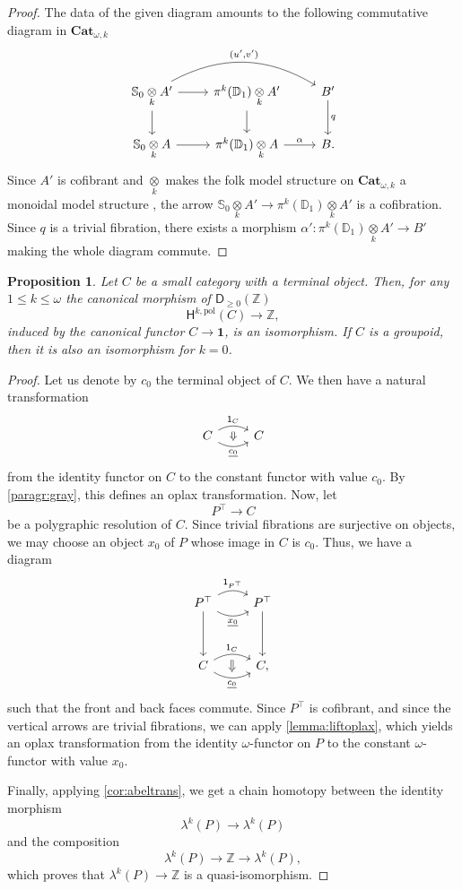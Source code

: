 \documentclass[reqno]{amsart}
\theoremstyle{plain}
\newtheorem{proposition}[subsubsection]{Proposition}
\theoremstyle{definition}
\theoremstyle{remark}
\newcommand{\nmbr}[1]{\mathbb #1}
\newcommand{\Z}{\nmbr{Z}}
\newcommand{\Unit}[1]{\mathsf{1}_{#1}}%
\newcommand{\ctg}[1]{\mathbf{#1}}  %
\newcommand{\Cat}{\ctg{Cat}}   %
\newcommand{\opCat}[1]{\Cat_{\omega,#1}} %
\newcommand{\Term}{\ctg{1}} %
\newcommand{\functor}[1]{\mathsf{#1}} %
\newcommand{\pifun}[2]{\functor{\pi}_{#2}^{#1}}%
\newcommand{\opifun}[1]{\pifun{#1}{}}%
\newcommand{\abel}{\functor{\lambda}} %
\newcommand{\abelk}[1]{\functor{\abel}^{#1}}%
\newcommand{\frgp}[1]{#1^\top} %
\newcommand{\oo}{\ensuremath{\omega}}
\newcommand{\Sph}[1]{\mathbb{S}_{#1}} %
\newcommand{\Dsk}[1]{\mathbb{D}_{#1}} %
\newcommand{\gray}{\otimes}
\newcommand{\grayk}[1]{\underset{#1}{\gray}} %
\newcommand{\cst}[1]{\underline{#1}} %
\newcommand{\Ho}{\functor{H}} %
\newcommand{\Hop}[1]{\Ho^{#1,\mathrm{pol}}} %
\newcommand{\Derp}[1]{\functor{D}_{\geq 0}(#1)}
\newcommand{\nbd}{\nobreakdash} %
\begin{document}
\begin{proof}
  The data of the given diagram amounts to the following commutative
  diagram in $\opCat{k}$
  \[
    \begin{tikzcd}
      \Sph{0} \grayk{k} A' \ar[r]\ar[d] \ar[rr,bend
      left,"{(u',v')}"]& \opifun{k}(\Dsk{1}) \grayk{k} A'
      \ar[d]& B' \ar[d,"q"] \\
      \Sph{0} \grayk{k} A \ar[r] & \opifun{k}(\Dsk{1}) \grayk{k} A \ar[r,"\alpha"]
      & B.
    \end{tikzcd}
  \]
  Since $A'$ is cofibrant and $\grayk{k}$ makes the folk model
  structure on $\opCat{k}$ a monoidal model structure \cite{ara_lucas:folmon}, the
  arrow $ \Sph{0}  \grayk{k} A' \to  \opifun{k}(\Dsk{1}) \grayk{k} A'$ is a
  cofibration. Since $q$ is a trivial fibration, there exists a
  morphism $\alpha' \colon \opifun{k}(\Dsk{1})  \grayk{k} A' \to B'$ making the
  whole diagram commute.
\end{proof}
\begin{proposition}\label{prop:hlgycontrcat}
  Let $C$ be a small category with a terminal object. Then, for any $1
  \leq k \leq \oo$ the
  canonical morphism of $\Derp{\Z}$
  \[
    \Hop{k}(C) \to \Z,
  \]
  induced by the canonical functor $C \to \Term$, is an
  isomorphism. If $C$ is a groupoid, then it is also an isomorphism
  for $k=0$.
\end{proposition}
\begin{proof}
  Let us denote by $c_0$ the terminal object of $C$. We then have a
  natural transformation
    \[
    \begin{tikzcd}
      C \ar[r,bend left,"\Unit{C}",""{name=A,below}]
      \ar[r,bend right,"\cst{c_0}"',""{name=B,above}] & C
      \ar[from=A,to=B,Rightarrow]
    \end{tikzcd}
  \]
  from the identity functor on $C$ to the constant functor with value
  $c_0$.  By \ref{paragr:gray}, this defines an oplax
  transformation. Now, let
  \[
    \frgp{P} \to C
  \]
  be a polygraphic resolution of $C$. Since trivial fibrations are
  surjective on objects, we may choose an object $x_0$ of $P$ whose image in
  $C$ is $c_0$. Thus, we have a diagram
  \[
    \begin{tikzcd}[row sep=huge]
      \frgp{P} \ar[d]\ar[r,bend left,"\Unit{\frgp{P}}"] \ar[r,bend
      right,"\cst{x_0}"']& \frgp{P} \ar[d] \\
      C \ar[r,bend left,"\Unit{C}",""{name=A,below}] \ar[r,bend
      right,"\cst{c_0}"',""{name=B,above}]& C,
      \ar[from=A,to=B,Rightarrow]
    \end{tikzcd}
  \]
  such that the front and back faces commute. Since
  $\frgp{P}$ is cofibrant, and since the vertical arrows are trivial
  fibrations, we can apply \cref{lemma:liftoplax}, which yields an
  oplax transformation from the identity \oo\nbd-functor on $P$ to
  the constant \oo\nbd-functor with value $x_0$.

  Finally, applying \cref{cor:abeltrans}, we get a chain homotopy
  between the identity morphism \[\abelk{k}(P) \to
    \abelk{k}(P)\] and the composition
  \[\abelk{k}(P) \to \Z \to
  \abelk{k}(P),\] which proves that  $\abelk{k}(P) \to
  \Z$ is a quasi-isomorphism.
\end{proof}
\end{document}
